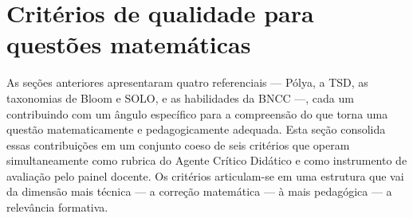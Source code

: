 \section{Critérios de qualidade para questões matemáticas}
\label{sec:criterios}


As seções anteriores apresentaram quatro referenciais --- Pólya, a TSD, as taxonomias de Bloom e SOLO,
e as habilidades da BNCC ---, cada um contribuindo com um ângulo específico para a compreensão do que
torna uma questão matematicamente e pedagogicamente adequada. Esta seção consolida essas contribuições
em um conjunto coeso de seis critérios que operam simultaneamente como rubrica do Agente Crítico
Didático e como instrumento de avaliação pelo painel docente. Os critérios articulam-se em uma estrutura
que vai da dimensão mais técnica --- a correção matemática --- à mais pedagógica --- a relevância
formativa.

